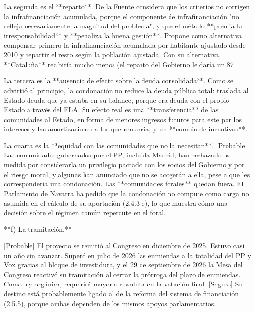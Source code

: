 \documentclass[10pt,a4paper]{article}
\begin{document}
La segunda es el **reparto**. De la Fuente considera que los criterios no corrigen la infrafinanciación acumulada, porque el componente de infrafinanciación "no refleja necesariamente la magnitud del problema", y que el método **premia la irresponsabilidad** y **penaliza la buena gestión**. Propone como alternativa compensar primero la infrafinanciación acumulada por habitante ajustado desde 2010 y repartir el resto según la población ajustada. Con su alternativa, **Cataluña** recibiría mucho menos (el reparto del Gobierno le daría un 87%

La tercera es la **ausencia de efecto sobre la deuda consolidada**. Como se advirtió al principio, la condonación no reduce la deuda pública total: traslada al Estado deuda que ya estaba en su balance, porque era deuda con el propio Estado a través del FLA. Su efecto real es una **transferencia** de las comunidades al Estado, en forma de menores ingresos futuros para este por los intereses y las amortizaciones a los que renuncia, y un **cambio de incentivos**.

La cuarta es la **equidad con las comunidades que no la necesitan**. [Probable] Las comunidades gobernadas por el PP, incluida Madrid, han rechazado la medida por considerarla un privilegio pactado con los socios del Gobierno y por el riesgo moral, y algunas han anunciado que no se acogerán a ella, pese a que les correspondería una condonación. Las **comunidades forales** quedan fuera. El Parlamento de Navarra ha pedido que la condonación no compute como carga no asumida en el cálculo de su aportación (2.4.3 e), lo que muestra cómo una decisión sobre el régimen común repercute en el foral.

**f) La tramitación.**

[Probable] El proyecto se remitió al Congreso en diciembre de 2025. Estuvo casi un año sin avanzar. Superó en julio de 2026 las enmiendas a la totalidad del PP y Vox gracias al bloque de investidura, y el 29 de septiembre de 2026 la Mesa del Congreso reactivó su tramitación al cerrar la prórroga del plazo de enmiendas. Como ley orgánica, requerirá mayoría absoluta en la votación final. [Seguro] Su destino está probablemente ligado al de la reforma del sistema de financiación (2.5.5), porque ambas dependen de los mismos apoyos parlamentarios.
\end{document}
